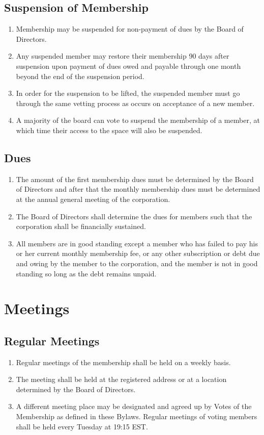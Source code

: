 \documentclass{article}
\begin{document}
\subsection{Suspension of Membership}
\begin{enumerate}
    \item Membership may be suspended for non-payment of dues by the Board of
Directors.
    \item Any suspended member may restore their membership 90 days after
    suspension upon payment of dues owed and payable through one month beyond
    the end of the suspension period.
    \item In order for the suspension to be lifted, the suspended member must
    go through the same vetting process as occurs on acceptance of a new
    member.
    \item A majority of the board can vote to suspend the membership of a
    member, at which time their access to the space will also be suspended.
\end{enumerate}
\subsection{Dues}
\begin{enumerate}
    \item The amount of the first membership dues must be determined by the
    Board of Directors and after that the monthly membership dues must be
    determined at the annual general meeting of the corporation.
    \item The Board of Directors shall determine the dues for members such that
    the corporation shall be financially sustained.
    \item All members are in good standing except a member who has failed to pay
    his or her current monthly membership fee, or any other subscription or debt
    due and owing by the member to the corporation, and the member is not in
    good standing so long as the debt remains unpaid.
\end{enumerate}
\section{Meetings}
\subsection{Regular Meetings}
\begin{enumerate}
    \item Regular meetings of the membership shall be held on a weekly basis.
    \item The meeting shall be held at the registered address or at a location
    determined by the Board of Directors.
    \item A different meeting place may be designated and agreed up by Votes of
    the Membership as defined in these Bylaws. Regular meetings of voting
    members shall be held every Tuesday at 19:15 EST.
\end{enumerate}
\end{document}
